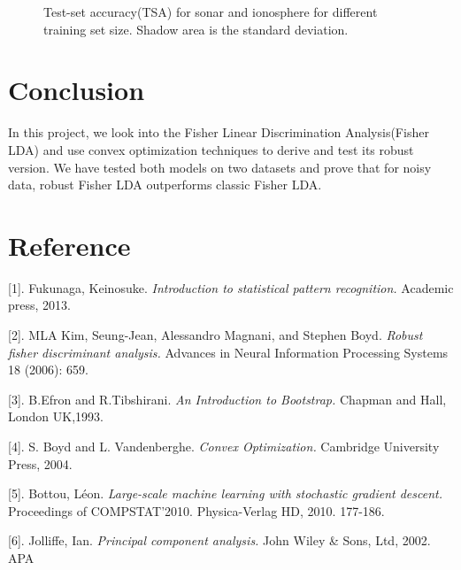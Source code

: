 \documentclass{article} %
\begin{document}
\begin{figure}[h]
\center
{}
\hfill
{}
\caption{Test-set accuracy(TSA) for sonar and ionosphere for different training set size. Shadow area is the standard deviation.}
\end{figure}

\section{Conclusion}
In this project, we look into the Fisher Linear Discrimination Analysis(Fisher LDA) and use convex optimization techniques to derive and test its robust version. We have tested both models on two datasets and prove that for noisy data, robust Fisher LDA outperforms classic Fisher LDA.

\section{Reference}
[1]. Fukunaga, Keinosuke. \emph{Introduction to statistical pattern recognition.} Academic press, 2013.

[2]. MLA Kim, Seung-Jean, Alessandro Magnani, and Stephen Boyd. \emph{Robust fisher discriminant analysis.} Advances in Neural Information Processing Systems 18 (2006): 659.

[3]. B.Efron and R.Tibshirani. \emph{An Introduction to Bootstrap.} Chapman and Hall, London UK,1993.

[4]. S. Boyd and L. Vandenberghe. \emph{Convex Optimization.} Cambridge University Press, 2004.

[5]. Bottou, Léon. \emph{Large-scale machine learning with stochastic gradient descent.} Proceedings of COMPSTAT'2010. Physica-Verlag HD, 2010. 177-186.

[6]. Jolliffe, Ian. \emph{Principal component analysis.} John Wiley \& Sons, Ltd, 2002. APA
\end{document}
